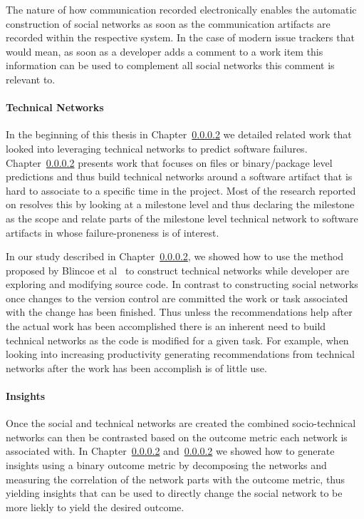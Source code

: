 The nature of how communication recorded electronically enables the automatic construction of social networks as soon as the communication artifacts are recorded within the respective system.
In the case of modern issue trackers that would mean, as soon as a developer adds a comment to a work item this information can be used to complement all social networks this comment is relevant to.

\paragraph{Technical Networks}
In the beginning of this thesis in Chapter~\ref{} we detailed related work that looked into leveraging technical networks to predict software failures.
Chapter~\ref{} presents work that focuses on files or binary/package level predictions and thus build technical networks around a software artifact that is hard to associate to a specific time in the project.
Most of the research reported on resolves this by looking at a milestone level and thus declaring the milestone as the scope and relate parts of the milestone level technical network to software artifacts in whose failure-proneness is of interest.

In our study described in Chapter~\ref{}, we showed how to use the method proposed by Blincoe et al~\cite{blincoe:cscw:2012} to construct technical networks while developer are exploring and modifying source code.
In contrast to constructing social networks once changes to the version control are committed the work or task associated with the change has been finished.
Thus unless the recommendations help after the actual work has been accomplished there is an inherent need to build technical networks as the code is modified for a given task.
For example, when looking into increasing productivity generating recommendations from technical networks after the work has been accomplish is of little use.

\paragraph{Insights}
Once the social and technical networks are created the combined socio-technical networks can then be contrasted based on the outcome metric each network is associated with.
In Chapter~\ref{} and~\ref{} we showed how to generate insights using a binary outcome metric by decomposing the networks and measuring the correlation of the network parts with the outcome metric, thus yielding insights that can be used to directly change the social network to be more liekly to yield the desired outcome.


